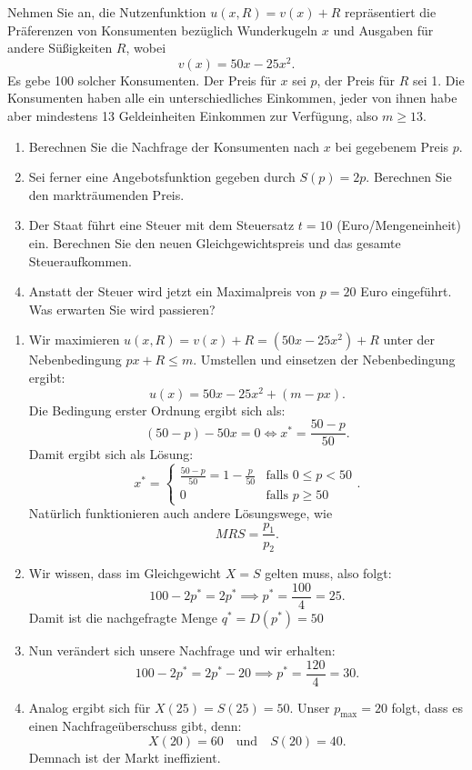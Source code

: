 \begin{question}
	Nehmen Sie an, die Nutzenfunktion $u(x, R) = v(x)+R$ repräsentiert die Präferenzen von Konsumenten bezüglich Wunderkugeln $x$ und Ausgaben für andere Süßigkeiten $R$, wobei \[v(x) = 50x - 25x^2.\] Es gebe 100 solcher Konsumenten.
	Der Preis für $x$ sei $p$, der Preis für $R$ sei 1. Die Konsumenten haben alle ein unterschiedliches Einkommen, jeder von ihnen habe aber mindestens 13 Geldeinheiten Einkommen zur Verfügung, also $m \geq 13$.
	\begin{enumerate}
		\item Berechnen Sie die Nachfrage der Konsumenten nach $x$ bei gegebenem Preis $p$.

		\item Sei ferner eine Angebotsfunktion gegeben durch $S(p) = 2p$. Berechnen Sie den markträumenden Preis.

		\item Der Staat führt eine Steuer mit dem Steuersatz $t = 10$ (Euro/Mengeneinheit) ein. Berechnen Sie den neuen Gleichgewichtspreis und das gesamte Steueraufkommen.

		\item Anstatt der Steuer wird jetzt ein Maximalpreis von $p = 20$ Euro eingeführt. Was erwarten Sie wird passieren?
	\end{enumerate}

\end{question}
\begin{solution}
	\begin{enumerate}
		\item	Wir maximieren $u(x,R) = v(x)+R = (50x-25x^2)+R$ unter der Nebenbedingung $px+R \le m$.
		      Umstellen und einsetzen der Nebenbedingung ergibt:
		      \[
			      u(x) = 50x-25x^2 + (m-px)
			      .\]
		      Die Bedingung erster Ordnung ergibt sich als:
		      \[
			      (50-p)-50x = 0 \iff x^* = \frac{50-p}{50}
			      .\]
		      Damit ergibt sich als Lösung:
		      \[
			      x^* = \begin{cases}
				      \frac{50-p}{50} = 1-\frac{p}{50} & \text{falls } 0 \le p < 50 \\
				      0                                & \text{falls } p \ge 50
			      \end{cases}
			      .\]
		      Natürlich funktionieren auch andere Lösungswege, wie
		      \[
			      MRS = \frac{p_1}{p_2}
			      .\]
		\item Wir wissen, dass im Gleichgewicht $X=S$ gelten muss, also folgt:
		      \[
			      100-2p^* = 2p^* \implies p^* = \frac{100}{4} = 25
			      .\] Damit ist die nachgefragte Menge $q^*= D(p^*) = 50$
		\item Nun verändert sich unsere Nachfrage und wir erhalten:
		      \[
			      100-2p^* = 2p^* - 20 \implies p^* = \frac{120}{4} = 30
			      .\]
		\item Analog ergibt sich für $X(25) = S(25) = 50$. Unser $p_{\max} = 20$ folgt, dass es einen Nachfrageüberschuss gibt, denn:
		      \[
			      X(20) = 60 \quad \text{und} \quad S(20) = 40
			      .\]
		      Demnach ist der Markt ineffizient.

	\end{enumerate}
\end{solution}

